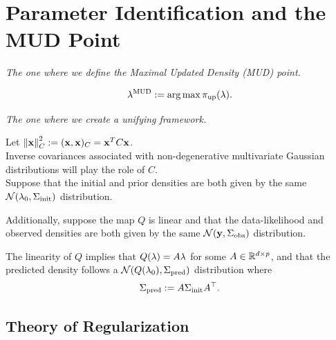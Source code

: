 \section{Parameter Identification and the MUD Point}

\begin{frame}{\it The one where we define the Maximal Updated Density (MUD) point.}

\begin{equation}\label{eq:mudpt_inital_defn}
	\lambda^{\text{MUD}} := \operatorname*{arg\,max} {\operatorname*{\pi_{up}}}(\lambda).
\end{equation}

\end{frame}

\begin{frame}[t]{\it The one where we create a unifying framework.}

Let $\left\Vert\mathbf{x}\right\Vert_C^2 := (\mathbf{x}, \mathbf{x})_C = \mathbf{x}^T C \mathbf{x}$. \\

Inverse covariances associated with non-degenerative multivariate Gaussian distributions will play the role of $C$. \\

Suppose that the initial and prior densities are both given by the same $\mathcal{N}(\lambda_0, \Sigma_\text{init})$ distribution.

\bigskip
Additionally, suppose the map $Q$ is linear and that the data-likelihood and observed densities are both given by the same $\mathcal{N}(\mathbf{y}, \Sigma_\text{obs})$ distribution.

\bigskip
The linearity of $Q$ implies that $Q(\lambda)=A\lambda$ for some $A\in\mathbb{R}^{d\times p}$, and that the predicted density follows a $\mathcal{N}(Q(\lambda_0), \Sigma_\text{pred})$ distribution where
\begin{equation}\label{eq:predictCov}
	\Sigma_\text{pred} := A\Sigma_\text{init} A^\top.
\end{equation}

\end{frame}

\subsection{Theory of Regularization}

